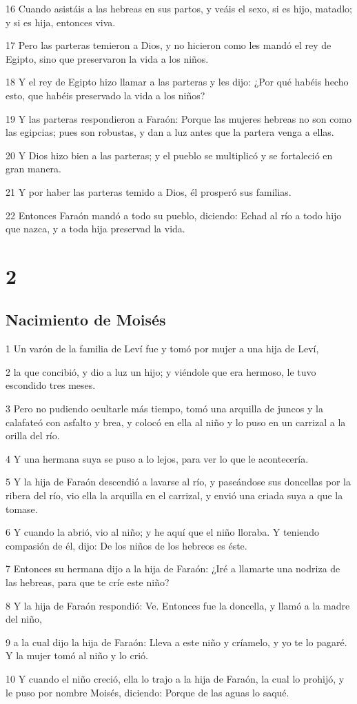 \par 16 Cuando asistáis a las hebreas en sus partos, y veáis el sexo, si es hijo, matadlo; y si es hija, entonces viva.
\par 17 Pero las parteras temieron a Dios, y no hicieron como les mandó el rey de Egipto, sino que preservaron la vida a los niños.
\par 18 Y el rey de Egipto hizo llamar a las parteras y les dijo: ¿Por qué habéis hecho esto, que habéis preservado la vida a los niños?
\par 19 Y las parteras respondieron a Faraón: Porque las mujeres hebreas no son como las egipcias; pues son robustas, y dan a luz antes que la partera venga a ellas.
\par 20 Y Dios hizo bien a las parteras; y el pueblo se multiplicó y se fortaleció en gran manera.
\par 21 Y por haber las parteras temido a Dios, él prosperó sus familias.
\par 22 Entonces Faraón mandó a todo su pueblo, diciendo: Echad al río a todo hijo que nazca, y a toda hija preservad la vida.

\chapter{2}

\section*{Nacimiento de Moisés}

\par 1 Un varón de la familia de Leví fue y tomó por mujer a una hija de Leví,
\par 2 la que concibió, y dio a luz un hijo; y viéndole que era hermoso, le tuvo escondido tres meses.
\par 3 Pero no pudiendo ocultarle más tiempo, tomó una arquilla de juncos y la calafateó con asfalto y brea, y colocó en ella al niño y lo puso en un carrizal a la orilla del río.
\par 4 Y una hermana suya se puso a lo lejos, para ver lo que le acontecería.
\par 5 Y la hija de Faraón descendió a lavarse al río, y paseándose sus doncellas por la ribera del río, vio ella la arquilla en el carrizal, y envió una criada suya a que la tomase.
\par 6 Y cuando la abrió, vio al niño; y he aquí que el niño lloraba. Y teniendo compasión de él, dijo: De los niños de los hebreos es éste.
\par 7 Entonces su hermana dijo a la hija de Faraón: ¿Iré a llamarte una nodriza de las hebreas, para que te críe este niño?
\par 8 Y la hija de Faraón respondió: Ve. Entonces fue la doncella, y llamó a la madre del niño,
\par 9 a la cual dijo la hija de Faraón: Lleva a este niño y críamelo, y yo te lo pagaré. Y la mujer tomó al niño y lo crió.
\par 10 Y cuando el niño creció, ella lo trajo a la hija de Faraón, la cual lo prohijó, y le puso por nombre Moisés, diciendo: Porque de las aguas lo saqué.

